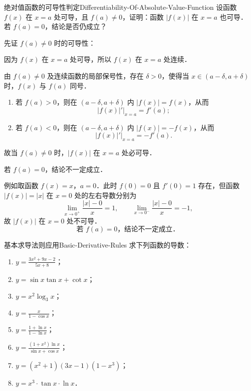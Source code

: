 \begin{problem}{绝对值函数的可导性判定}{Differentiability-Of-Absolute-Value-Function}
    设函数 $f(x)$ 在 $x = a$ 处可导，且 $f(a) \neq 0$，证明：函数 $|f(x)|$ 在 $x = a$ 也可导．若 $f(a) = 0$，结论是否仍成立？
\end{problem}

\begin{solution}
    先证 $f(a) \neq 0$ 时的可导性：

    因为 $f(x)$ 在 $x = a$ 处可导，所以 $f(x)$ 在 $x = a$ 处连续．

    由 $f(a) \neq 0$ 及连续函数的局部保号性，存在 $\delta > 0$，使得当 $x \in (a - \delta, a + \delta)$ 时，$f(x)$ 与 $f(a)$ 同号．
    \begin{enumerate}
        \item 若 $f(a) > 0$，则在 $(a - \delta, a + \delta)$ 内 $|f(x)| = f(x)$，从而
              \begin{equation}
                  \left. |f(x)|' \right|_{x=a} = f'(a);
              \end{equation}
        \item 若 $f(a) < 0$，则在 $(a - \delta, a + \delta)$ 内 $|f(x)| = -f(x)$，从而
              \begin{equation}
                  \left. |f(x)|' \right|_{x=a} = -f'(a).
              \end{equation}
    \end{enumerate}
    故当 $f(a) \neq 0$ 时，$|f(x)|$ 在 $x = a$ 处必可导．

    若 $f(a) = 0$，结论不一定成立．

    例如取函数 $f(x) = x$，$a = 0$．此时 $f(0) = 0$ 且 $f'(0) = 1$ 存在，但函数 $|f(x)| = |x|$ 在 $x = 0$ 处的左右导数分别为
    \begin{equation}
        \lim_{x\to 0^+} \frac{|x| - 0}{x} = 1, \qquad \lim_{x\to 0^-} \frac{|x| - 0}{x} = -1,
    \end{equation}
    故 $|f(x)|$ 在 $x = 0$ 处不可导．
    \begin{equation}
        \boxed{\text{若 } f(a) = 0\text{，结论不一定成立．}}
    \end{equation}
\end{solution}

\begin{problem}{基本求导法则应用}{Basic-Derivative-Rules}
    求下列函数的导数：
    \begin{enumerate}
        \item $y = \frac{3x^2+9x-2}{5x+8}$；
        \item $y = \sin x \tan x + \cot x$；
        \item $y = x^2 \log_3 x$；
        \item $y = \frac{x}{1-\cos x}$；
        \item $y = \frac{1+\ln x}{1-\ln x}$；
        \item $y = \frac{(1+x^2)\ln x}{\sin x+\cos x}$；
        \item $y = (x^2+1)(3x-1)(1-x^3)$；
        \item $y = x^3 \cdot \tan x \cdot \ln x$．
    \end{enumerate}
\end{problem}

